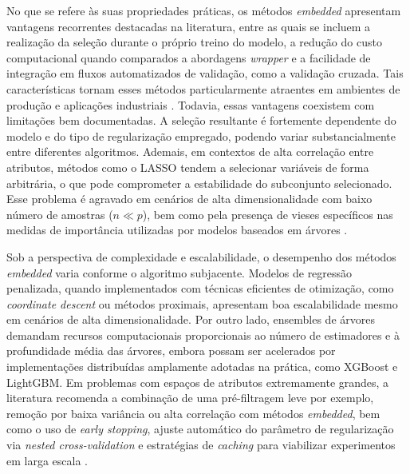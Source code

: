 No que se refere às suas propriedades práticas, os métodos \textit{embedded} apresentam vantagens recorrentes destacadas na literatura, entre as quais se incluem a realização da seleção durante o próprio treino do modelo, a redução do custo computacional quando comparados a abordagens \textit{wrapper} e a facilidade de integração em fluxos automatizados de validação, como a validação cruzada. Tais características tornam esses métodos particularmente atraentes em ambientes de produção e aplicações industriais \cite{Theng2024,Dhal2022,10.1007/978-3-031-23092-9_12}. Todavia, essas vantagens coexistem com limitações bem documentadas. A seleção resultante é fortemente dependente do modelo e do tipo de regularização empregado, podendo variar substancialmente entre diferentes algoritmos. Ademais, em contextos de alta correlação entre atributos, métodos como o LASSO tendem a selecionar variáveis de forma arbitrária, o que pode comprometer a estabilidade do subconjunto selecionado. Esse problema é agravado em cenários de alta dimensionalidade com baixo número de amostras ($n \ll p$), bem como pela presença de vieses específicos nas medidas de importância utilizadas por modelos baseados em árvores \cite{KHAIRE20221060,BARBIERI2024123667,EBRAHIMIWARKIANI2025129372,Theng2024}.

Sob a perspectiva de complexidade e escalabilidade, o desempenho dos métodos \textit{embedded} varia conforme o algoritmo subjacente. Modelos de regressão penalizada, quando implementados com técnicas eficientes de otimização, como \textit{coordinate descent} ou métodos proximais, apresentam boa escalabilidade mesmo em cenários de alta dimensionalidade. Por outro lado, ensembles de árvores demandam recursos computacionais proporcionais ao número de estimadores e à profundidade média das árvores, embora possam ser acelerados por implementações distribuídas amplamente adotadas na prática, como XGBoost e LightGBM. Em problemas com espaços de atributos extremamente grandes, a literatura recomenda a combinação de uma pré-filtragem leve por exemplo, remoção por baixa variância ou alta correlação com métodos \textit{embedded}, bem como o uso de \textit{early stopping}, ajuste automático do parâmetro de regularização via \textit{nested cross-validation} e estratégias de \textit{caching} para viabilizar experimentos em larga escala \cite{Theng2024,Bouchlaghem2022,Emmoh2024,10.1007/978-3-031-23092-9_12}.

